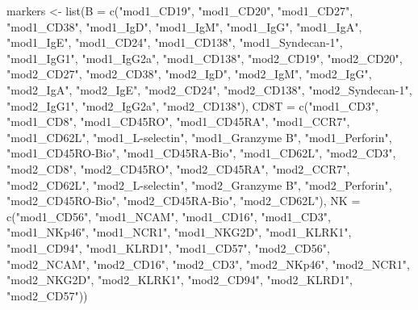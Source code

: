 \documentclass[]{article}
\newcommand{\hlstr}[1]{\textcolor[rgb]{0.251,0.627,0.251}{#1}}%
\newcommand{\hlstd}[1]{\textcolor[rgb]{0.251,0.251,0.251}{#1}}%
\newenvironment{Shaded}{\begin{myshaded}}{\end{myshaded}}
\newcommand{\StringTok}[1]{\hlstr{#1}}
\newcommand{\OtherTok}[1]{{#1}}
\newcommand{\FunctionTok}[1]{\hlstd{#1}}
\newcommand{\AttributeTok}[1]{{#1}}
\newcommand{\NormalTok}[1]{\hlstd{#1}}
\begin{document}
\begin{Shaded}
\begin{Highlighting}[]
\NormalTok{markers }\OtherTok{\textless{}{-}} \FunctionTok{list}\NormalTok{(}\AttributeTok{B =} \FunctionTok{c}\NormalTok{(}\StringTok{"mod1\_CD19"}\NormalTok{, }\StringTok{"mod1\_CD20"}\NormalTok{, }\StringTok{"mod1\_CD27"}\NormalTok{,}
    \StringTok{"mod1\_CD38"}\NormalTok{, }\StringTok{"mod1\_IgD"}\NormalTok{, }\StringTok{"mod1\_IgM"}\NormalTok{, }\StringTok{"mod1\_IgG"}\NormalTok{, }\StringTok{"mod1\_IgA"}\NormalTok{,}
    \StringTok{"mod1\_IgE"}\NormalTok{, }\StringTok{"mod1\_CD24"}\NormalTok{, }\StringTok{"mod1\_CD138"}\NormalTok{, }\StringTok{"mod1\_Syndecan{-}1"}\NormalTok{,}
    \StringTok{"mod1\_IgG1"}\NormalTok{, }\StringTok{"mod1\_IgG2a"}\NormalTok{, }\StringTok{"mod1\_CD138"}\NormalTok{, }\StringTok{"mod2\_CD19"}\NormalTok{, }\StringTok{"mod2\_CD20"}\NormalTok{,}
    \StringTok{"mod2\_CD27"}\NormalTok{, }\StringTok{"mod2\_CD38"}\NormalTok{, }\StringTok{"mod2\_IgD"}\NormalTok{, }\StringTok{"mod2\_IgM"}\NormalTok{, }\StringTok{"mod2\_IgG"}\NormalTok{,}
    \StringTok{"mod2\_IgA"}\NormalTok{, }\StringTok{"mod2\_IgE"}\NormalTok{, }\StringTok{"mod2\_CD24"}\NormalTok{, }\StringTok{"mod2\_CD138"}\NormalTok{, }\StringTok{"mod2\_Syndecan{-}1"}\NormalTok{,}
    \StringTok{"mod2\_IgG1"}\NormalTok{, }\StringTok{"mod2\_IgG2a"}\NormalTok{, }\StringTok{"mod2\_CD138"}\NormalTok{), }\AttributeTok{CD8T =} \FunctionTok{c}\NormalTok{(}\StringTok{"mod1\_CD3"}\NormalTok{,}
    \StringTok{"mod1\_CD8"}\NormalTok{, }\StringTok{"mod1\_CD45RO"}\NormalTok{, }\StringTok{"mod1\_CD45RA"}\NormalTok{, }\StringTok{"mod1\_CCR7"}\NormalTok{, }\StringTok{"mod1\_CD62L"}\NormalTok{,}
    \StringTok{"mod1\_L{-}selectin"}\NormalTok{, }\StringTok{"mod1\_Granzyme B"}\NormalTok{, }\StringTok{"mod1\_Perforin"}\NormalTok{, }\StringTok{"mod1\_CD45RO{-}Bio"}\NormalTok{,}
    \StringTok{"mod1\_CD45RA{-}Bio"}\NormalTok{, }\StringTok{"mod1\_CD62L"}\NormalTok{, }\StringTok{"mod2\_CD3"}\NormalTok{, }\StringTok{"mod2\_CD8"}\NormalTok{,}
    \StringTok{"mod2\_CD45RO"}\NormalTok{, }\StringTok{"mod2\_CD45RA"}\NormalTok{, }\StringTok{"mod2\_CCR7"}\NormalTok{, }\StringTok{"mod2\_CD62L"}\NormalTok{,}
    \StringTok{"mod2\_L{-}selectin"}\NormalTok{, }\StringTok{"mod2\_Granzyme B"}\NormalTok{, }\StringTok{"mod2\_Perforin"}\NormalTok{, }\StringTok{"mod2\_CD45RO{-}Bio"}\NormalTok{,}
    \StringTok{"mod2\_CD45RA{-}Bio"}\NormalTok{, }\StringTok{"mod2\_CD62L"}\NormalTok{), }\AttributeTok{NK =} \FunctionTok{c}\NormalTok{(}\StringTok{"mod1\_CD56"}\NormalTok{, }\StringTok{"mod1\_NCAM"}\NormalTok{,}
    \StringTok{"mod1\_CD16"}\NormalTok{, }\StringTok{"mod1\_CD3"}\NormalTok{, }\StringTok{"mod1\_NKp46"}\NormalTok{, }\StringTok{"mod1\_NCR1"}\NormalTok{, }\StringTok{"mod1\_NKG2D"}\NormalTok{,}
    \StringTok{"mod1\_KLRK1"}\NormalTok{, }\StringTok{"mod1\_CD94"}\NormalTok{, }\StringTok{"mod1\_KLRD1"}\NormalTok{, }\StringTok{"mod1\_CD57"}\NormalTok{, }\StringTok{"mod2\_CD56"}\NormalTok{,}
    \StringTok{"mod2\_NCAM"}\NormalTok{, }\StringTok{"mod2\_CD16"}\NormalTok{, }\StringTok{"mod2\_CD3"}\NormalTok{, }\StringTok{"mod2\_NKp46"}\NormalTok{, }\StringTok{"mod2\_NCR1"}\NormalTok{,}
    \StringTok{"mod2\_NKG2D"}\NormalTok{, }\StringTok{"mod2\_KLRK1"}\NormalTok{, }\StringTok{"mod2\_CD94"}\NormalTok{, }\StringTok{"mod2\_KLRD1"}\NormalTok{, }\StringTok{"mod2\_CD57"}\NormalTok{))}


\end{Highlighting}
\end{Shaded}
\end{document}
